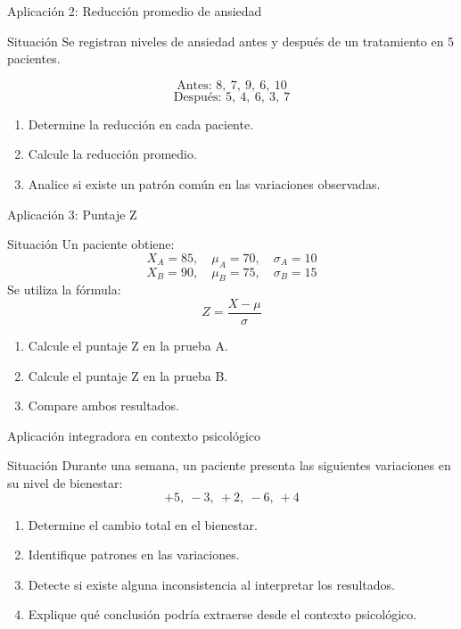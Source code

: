 \documentclass[handout,aspectratio=169,10pt]{beamer}
\begin{document}
	\begin{frame}{Aplicación 2: Reducción promedio de ansiedad}
		\begin{block}{Situación}
			Se registran niveles de ansiedad antes y después de un tratamiento en 5 pacientes.
			
			\[
			\text{Antes: } 8,\ 7,\ 9,\ 6,\ 10
			\]
			\[
			\text{Después: } 5,\ 4,\ 6,\ 3,\ 7
			\]
		\end{block}
		
		\begin{enumerate}[<+->]
			\item Determine la reducción en cada paciente.
			\item Calcule la reducción promedio.
			\item Analice si existe un patrón común en las variaciones observadas.
		\end{enumerate}
	\end{frame}
	
	\begin{frame}{Aplicación 3: Puntaje Z}
		\begin{block}{Situación}
			Un paciente obtiene:
			\[
			X_A=85,\quad \mu_A=70,\quad \sigma_A=10
			\]
			\[
			X_B=90,\quad \mu_B=75,\quad \sigma_B=15
			\]
			Se utiliza la fórmula:
			\[
			Z=\frac{X-\mu}{\sigma}
			\]
		\end{block}
		
		\begin{enumerate}[<+->]
			\item Calcule el puntaje Z en la prueba A.
			\item Calcule el puntaje Z en la prueba B.
			\item Compare ambos resultados.
		\end{enumerate}
	\end{frame}
	
	\begin{frame}{Aplicación integradora en contexto psicológico}
		\begin{block}{Situación}
			Durante una semana, un paciente presenta las siguientes variaciones en su nivel de bienestar:
			\[
			+5,\ -3,\ +2,\ -6,\ +4
			\]
		\end{block}
		
		\begin{enumerate}[<+->]
			\item Determine el cambio total en el bienestar.
			\item Identifique patrones en las variaciones.
			\item Detecte si existe alguna inconsistencia al interpretar los resultados.
			\item Explique qué conclusión podría extraerse desde el contexto psicológico.
		\end{enumerate}
	\end{frame}
	
\end{document}
